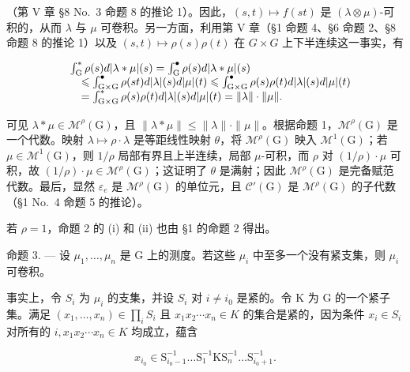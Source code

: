 （第 V 章 §8 No.~3 命题 8 的推论 1）。因此，\((s,t) \mapsto f(st)\) 是 \((\lambda \otimes \mu)\)-可积的，从而 \(\lambda\) 与 \(\mu\) 可卷积。另一方面，利用第 V 章（§1 命题 4、§6 命题 2、§8 命题 8 的推论 1）以及 \((s,t) \mapsto \rho(s)\rho(t)\) 在 \(G \times G\) 上下半连续这一事实，有

\[
\begin{array}{r l} & {\int_ {\mathrm{G}} ^ {*} \rho (s) d | \lambda * \mu | (s) = \int_ {\mathrm{G}} ^ {\bullet} \rho (s) d | \lambda * \mu | (s)} \\ & {\quad \leqslant \int_ {\mathrm{G} \times \mathrm{G}} ^ {\bullet} \rho (s t) d | \lambda | (s) d | \mu | (t) \leqslant \int_ {\mathrm{G} \times \mathrm{G}} ^ {\bullet} \rho (s) \rho (t) d | \lambda | (s) d | \mu | (t)} \\ & {\quad = \int_ {\mathrm{G} \times \mathrm{G}} ^ {*} \rho (s) \rho (t) d | \lambda | (s) d | \mu | (t) = \| \lambda \| \cdot \| \mu \|.} \end{array}
\]

可见 \(\lambda * \mu \in \mathcal{M}^{\rho}(\mathrm{G})\)，且 \(\| \lambda * \mu \| \leqslant \| \lambda \| \cdot \| \mu \|\)。根据命题 1，\(\mathcal{M}^{\rho}(\mathrm{G})\) 是一个代数。映射 \(\lambda \mapsto \rho \cdot \lambda\) 是等距线性映射 \(\theta\)，将 \(\mathcal{M}^{\rho}(\mathrm{G})\) 映入 \(\mathcal{M}^{1}(\mathrm{G})\)；若 \(\mu \in \mathcal{M}^{1}(\mathrm{G})\)，则 \(1 / \rho\) 局部有界且上半连续，局部 \(\mu\)-可积，而 \(\rho\) 对 \((1 / \rho) \cdot \mu\) 可积，故 \((1 / \rho) \cdot \mu \in \mathcal{M}^{\rho}(\mathrm{G})\)；这证明了 \(\theta\) 是满射；因此 \(\mathcal{M}^{\rho}(\mathrm{G})\) 是完备赋范代数。最后，显然 \(\varepsilon_{e}\) 是 \(\mathcal{M}^{\rho}(\mathrm{G})\) 的单位元，且 \(\mathcal{C}'(\mathrm{G})\) 是 \(\mathcal{M}^{\rho}(\mathrm{G})\) 的子代数（§1 No.~4 命题 5 的推论）。

若 \(\rho = 1\)，命题 2 的 (i) 和 (ii) 也由 §1 的命题 2 得出。

命题 3. --- 设 \(\mu_1, \ldots, \mu_n\) 是 G 上的测度。若这些 \(\mu_i\) 中至多一个没有紧支集，则 \(\mu_i\) 可卷积。

事实上，令 \(S_{i}\) 为 \(\mu_{i}\) 的支集，并设 \(S_{i}\) 对 \(i \neq i_{0}\) 是紧的。令 K 为 G 的一个紧子集。满足 \((x_{1}, \ldots, x_{n}) \in \prod_{i} S_{i}\) 且 \(x_{1}x_{2} \cdots x_{n} \in K\) 的集合是紧的，因为条件 \(x_{i} \in S_{i}\) 对所有的 \(i, x_{1}x_{2} \cdots x_{n} \in K\) 均成立，蕴含

\[
x _ {i _ {0}} \in \mathrm{S} _ {i _ {0} - 1} ^ {- 1} \dots \mathrm{S} _ {1} ^ {- 1} \mathrm{KS} _ {n} ^ {- 1} \dots \mathrm{S} _ {i _ {0} + 1} ^ {- 1}.
\]

